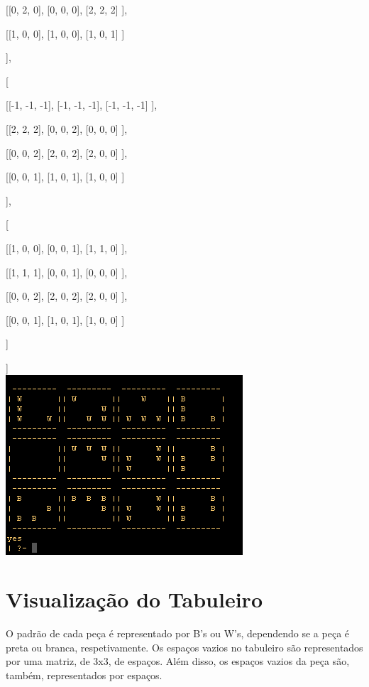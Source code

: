 \documentclass[a4paper]{article}
\begin{document}
		 [[0, 2, 0],
		  [0, 0, 0],
		  [2, 2, 2]
		 ],

		 [[1, 0, 0],
		  [1, 0, 0],
		  [1, 0, 1]
		 ]

		],



		[

		 [[-1, -1, -1],
		  [-1, -1, -1],
		  [-1, -1, -1]
		 ],

		 [[2, 2, 2],
		  [0, 0, 2],
		  [0, 0, 0]
		 ],

		 [[0, 0, 2],
		  [2, 0, 2],
		  [2, 0, 0]
		 ],

		 [[0, 0, 1],
		  [1, 0, 1],
		  [1, 0, 0]
		 ]

		],


		[

		 [[1, 0, 0],
		  [0, 0, 1],
		  [1, 1, 0]
		 ],

		 [[1, 1, 1],
		  [0, 0, 1],
		  [0, 0, 0]
		 ],

		 [[0, 0, 2],
		  [2, 0, 2],
		  [2, 0, 0]
		 ],

		 [[0, 0, 1],
		  [1, 0, 1],
		  [1, 0, 0]
		 ]

		]
		
	]\linebreak\linebreak\\

\includegraphics[scale=0.6]{../printscreens/winning_board.png} \linebreak




\section{Visualização do Tabuleiro}

O padrão de cada peça é representado por B's ou W's, dependendo se a peça é preta ou branca, respetivamente. Os espaços vazios no tabuleiro são representados por uma matriz, de 3x3, de espaços. Além disso, os espaços vazios da peça são, também, representados por espaços.
\end{document}

